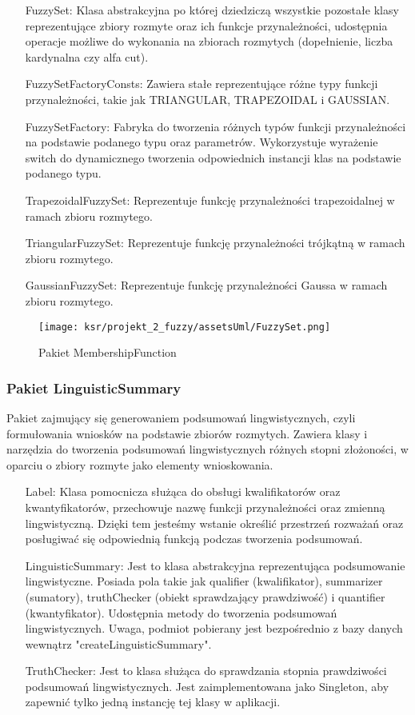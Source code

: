 \documentclass{article}
\begin{document}
\begin{itemize}
    \item[FuzzySet:] Klasa abstrakcyjna po której dziedziczą wszystkie pozostałe klasy reprezentujące zbiory rozmyte oraz ich funkcje przynależności, udostępnia operacje możliwe do wykonania na zbiorach rozmytych (dopełnienie, liczba kardynalna czy alfa cut).
    \item[FuzzySetFactoryConsts:] Zawiera stałe reprezentujące różne typy funkcji przynależności, takie jak TRIANGULAR, TRAPEZOIDAL i GAUSSIAN.
    \item[FuzzySetFactory:] Fabryka do tworzenia różnych typów funkcji przynależności na podstawie podanego typu oraz parametrów.
    Wykorzystuje wyrażenie switch do dynamicznego tworzenia odpowiednich instancji klas na podstawie podanego typu.
    \item[TrapezoidalFuzzySet:] Reprezentuje funkcję przynależności trapezoidalnej w ramach zbioru rozmytego.
    \item[TriangularFuzzySet:] Reprezentuje funkcję przynależności trójkątną w ramach zbioru rozmytego.
    \item[GaussianFuzzySet:] Reprezentuje funkcję przynależności Gaussa w ramach zbioru rozmytego.
\end{itemize}

\begin{figure}[H]
\centering
\texttt{[image: ksr/projekt\_2\_fuzzy/assetsUml/FuzzySet.png]}
\caption{Pakiet MembershipFunction}
\label{fig:epsilon_bat}
\end{figure}

\subsubsection{Pakiet LinguisticSummary}

\noindent Pakiet zajmujący się generowaniem podsumowań lingwistycznych, czyli formułowania wniosków na podstawie zbiorów rozmytych. Zawiera klasy i narzędzia do tworzenia podsumowań lingwistycznych różnych stopni złożoności, w oparciu o zbiory rozmyte jako elementy wnioskowania.

\begin{itemize}
    \item[Label:] Klasa pomocnicza służąca do obsługi kwalifikatorów oraz kwantyfikatorów, przechowuje nazwę funkcji przynależności oraz zmienną lingwistyczną. Dzięki tem jesteśmy wstanie określić przestrzeń rozważań oraz posługiwać się odpowiednią funkcją podczas tworzenia podsumowań.
    \item[LinguisticSummary:]  Jest to klasa abstrakcyjna reprezentująca podsumowanie lingwistyczne. Posiada pola takie jak qualifier (kwalifikator), summarizer (sumatory), truthChecker (obiekt sprawdzający prawdziwość) i quantifier (kwantyfikator). Udostępnia metody do tworzenia podsumowań lingwistycznych. Uwaga, podmiot pobierany jest bezpośrednio z bazy danych wewnątrz "createLinguisticSummary".
    \item[TruthChecker:] Jest to klasa służąca do sprawdzania stopnia prawdziwości podsumowań lingwistycznych. Jest zaimplementowana jako Singleton, aby zapewnić tylko jedną instancję tej klasy w aplikacji.
\end{itemize}
\end{document}
